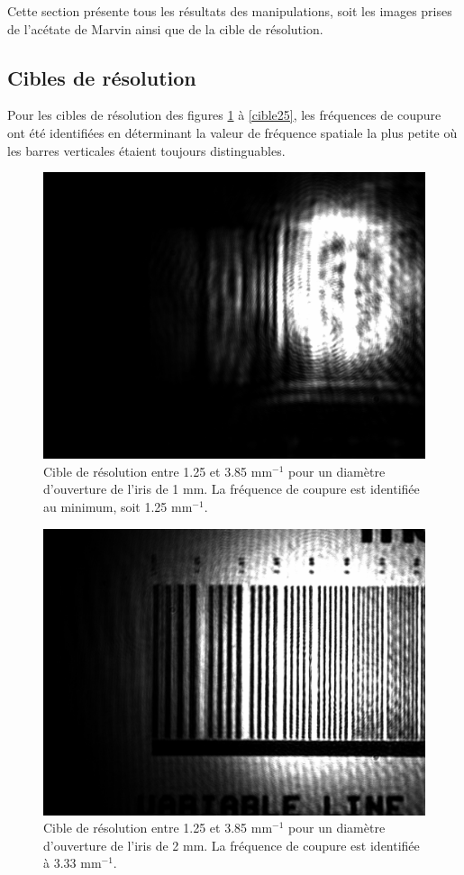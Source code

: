 \documentclass[11pt,letterpaper]{article}
\begin{document}
Cette section présente tous les résultats des manipulations, soit les images prises de l'acétate de Marvin
ainsi que de la cible de résolution.

\subsection{Cibles de résolution}

Pour les cibles de résolution des figures \ref{cible1.2} à \ref{cible25}, les fréquences de coupure ont été identifiées en déterminant la
valeur de fréquence spatiale la plus petite où les barres verticales étaient toujours distinguables.

\begin{figure}[H]
  \centering
  \includegraphics[scale=0.26]{cible_d1.2_1-7.png}
  \caption{Cible de résolution entre 1.25 et 3.85 mm$^{-1}$ pour un diamètre d'ouverture de l'iris de 1 mm. La fréquence de coupure est identifiée au minimum, soit 1.25 mm$^{-1}$.}
  \label{cible1.2}
\end{figure}

\begin{figure}[H]
  \centering
  \includegraphics[scale=0.26]{cible_d2_1-7.png}
  \caption{Cible de résolution entre 1.25 et 3.85 mm$^{-1}$ pour un diamètre d'ouverture de l'iris de 2 mm. La fréquence de coupure est identifiée à 3.33 mm$^{-1}$.}
  \label{cible2}
\end{figure}
\end{document}
